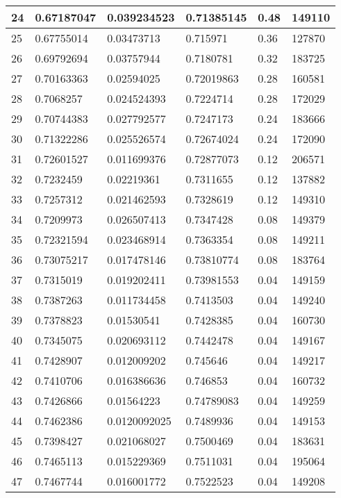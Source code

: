 \begin{longtable}{|l|l|l|l|l|l|}
24 & 0.67187047 & 0.039234523 & 0.71385145 & 0.48 & 149110 \\ \hline 
25 & 0.67755014 & 0.03473713 & 0.715971 & 0.36 & 127870 \\ \hline 
26 & 0.69792694 & 0.03757944 & 0.7180781 & 0.32 & 183725 \\ \hline 
27 & 0.70163363 & 0.02594025 & 0.72019863 & 0.28 & 160581 \\ \hline 
28 & 0.7068257 & 0.024524393 & 0.7224714 & 0.28 & 172029 \\ \hline 
29 & 0.70744383 & 0.027792577 & 0.7247173 & 0.24 & 183666 \\ \hline 
30 & 0.71322286 & 0.025526574 & 0.72674024 & 0.24 & 172090 \\ \hline 
31 & 0.72601527 & 0.011699376 & 0.72877073 & 0.12 & 206571 \\ \hline 
32 & 0.7232459 & 0.02219361 & 0.7311655 & 0.12 & 137882 \\ \hline 
33 & 0.7257312 & 0.021462593 & 0.7328619 & 0.12 & 149310 \\ \hline 
34 & 0.7209973 & 0.026507413 & 0.7347428 & 0.08 & 149379 \\ \hline 
35 & 0.72321594 & 0.023468914 & 0.7363354 & 0.08 & 149211 \\ \hline 
36 & 0.73075217 & 0.017478146 & 0.73810774 & 0.08 & 183764 \\ \hline 
37 & 0.7315019 & 0.019202411 & 0.73981553 & 0.04 & 149159 \\ \hline 
38 & 0.7387263 & 0.011734458 & 0.7413503 & 0.04 & 149240 \\ \hline 
39 & 0.7378823 & 0.01530541 & 0.7428385 & 0.04 & 160730 \\ \hline 
40 & 0.7345075 & 0.020693112 & 0.7442478 & 0.04 & 149167 \\ \hline 
41 & 0.7428907 & 0.012009202 & 0.745646 & 0.04 & 149217 \\ \hline 
42 & 0.7410706 & 0.016386636 & 0.746853 & 0.04 & 160732 \\ \hline 
43 & 0.7426866 & 0.01564223 & 0.74789083 & 0.04 & 149259 \\ \hline 
44 & 0.7462386 & 0.0120092025 & 0.7489936 & 0.04 & 149153 \\ \hline 
45 & 0.7398427 & 0.021068027 & 0.7500469 & 0.04 & 183631 \\ \hline 
46 & 0.7465113 & 0.015229369 & 0.7511031 & 0.04 & 195064 \\ \hline 
47 & 0.7467744 & 0.016001772 & 0.7522523 & 0.04 & 149208 \\ \hline 

\end{longtable}
